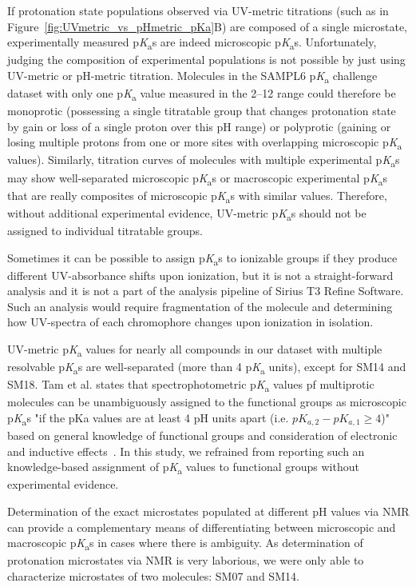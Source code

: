 \documentclass[9pt,lineno]{elife}
\newcommand{\pKa}{p\textit{K}\textsubscript{a}}
\begin{document}
If protonation state populations observed via UV-metric titrations (such as in Figure~\ref{fig:UVmetric_vs_pHmetric_pKa}B) are composed of a single microstate, experimentally measured \pKa{}s are indeed microscopic \pKa{}s.  
Unfortunately, judging the composition of experimental populations is not possible by just using UV-metric or pH-metric titration. 
Molecules in the SAMPL6 \pKa{} challenge dataset with only one \pKa{} value measured in the 2--12 range could therefore be monoprotic (possessing a single titratable group that changes protonation state by gain or loss of a single proton over this pH range) or polyprotic (gaining or losing multiple protons from one or more sites with overlapping microscopic \pKa{} values). 
Similarly, titration curves of molecules with multiple experimental \pKa{}s may show well-separated microscopic \pKa{}s or macroscopic experimental \pKa{}s that are really composites of microscopic \pKa{}s with similar values. 
Therefore, without additional experimental evidence, UV-metric \pKa{}s should not be assigned to individual titratable groups. 

Sometimes it can be possible to assign \pKa{}s to ionizable groups if they produce different UV-absorbance shifts upon ionization, but it is not a straight-forward analysis and it is not a part of the analysis pipeline of Sirius T3 Refine Software. Such an analysis would require fragmentation of the molecule and determining how UV-spectra of each chromophore changes upon ionization in isolation. 

UV-metric \pKa{} values for nearly all compounds in our dataset with multiple resolvable \pKa{}s are well-separated (more than 4 \pKa{} units), except for SM14 and SM18. Tam et al. states that spectrophotometric \pKa{} values pf multiprotic molecules can be unambiguously assigned to the functional groups as microscopic \pKa{}s "if the pKa values are at least 4 pH units apart (i.e. $pK_{a,2} - pK_{a,1} \geq 4$)" based on general knowledge of functional groups and consideration of electronic and inductive effects~\citep{tam_multi-wavelength_2001}. In this study, we refrained from reporting such an knowledge-based assignment of \pKa{} values to functional groups without experimental evidence.

Determination of the exact microstates populated at different pH values via NMR can provide a complementary means of differentiating between microscopic and macroscopic \pKa{}s in cases where there is ambiguity.
As determination of protonation microstates via NMR is very laborious, we were only able to characterize microstates of two molecules: SM07 and SM14. 
\end{document}
